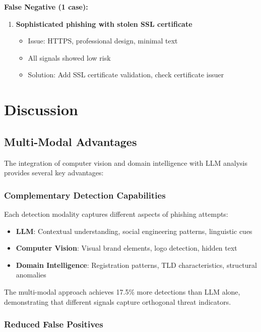 \documentclass[conference]{IEEEtran}
\begin{document}
\textbf{False Negative (1 case):}

\begin{enumerate}
\item \textbf{Sophisticated phishing with stolen SSL certificate}
  \begin{itemize}
  \item Issue: HTTPS, professional design, minimal text
  \item All signals showed low risk
  \item Solution: Add SSL certificate validation, check certificate issuer
  \end{itemize}
\end{enumerate}


\section{Discussion}

\subsection{Multi-Modal Advantages}

The integration of computer vision and domain intelligence with LLM analysis provides several key advantages:

\subsubsection{Complementary Detection Capabilities}

Each detection modality captures different aspects of phishing attempts:
\begin{itemize}
\item \textbf{LLM}: Contextual understanding, social engineering patterns, linguistic cues
\item \textbf{Computer Vision}: Visual brand elements, logo detection, hidden text
\item \textbf{Domain Intelligence}: Registration patterns, TLD characteristics, structural anomalies
\end{itemize}

The multi-modal approach achieves 17.5\% more detections than LLM alone, demonstrating that different signals capture orthogonal threat indicators.

\subsubsection{Reduced False Positives}
\end{document}
